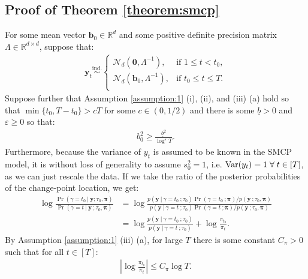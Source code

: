 \subsection{Proof of Theorem \ref{theorem:smcp}}
\label{app:localization-smcp}

For some mean vector $\mathbf{b}_0 \in \mathbb{R}^d$ and some positive definite precision matrix $\Lambda \in \mathbb{R}^{d \times d}$, suppose that:
\begin{align*}
    \mathbf{y}_t \overset{\text{ind.}}{\sim}
    \begin{cases}
        \mathcal{N}_d(\mathbf{0},\Lambda^{-1}), &\text{if } 1 \leq t < t_0, \\
        \mathcal{N}_d(\mathbf{b}_0,\Lambda^{-1}), &\text{if } t_0 \leq t \leq T. \\
    \end{cases}
\end{align*}
Suppose further that Assumption \ref{assumption:1} (i), (ii), and (iii) (a) hold so that $\min\{t_0, T-t_0\} > cT$ for some $c \in (0,1/2)$ and there is some $\underline{b} > 0$ and $\varepsilon \geq 0$ so that:
\begin{align}\label{eq:thm1-b_0-bd}
    b^2_0 \geq \frac{\underline{b}^2}{\log^{\varepsilon} T}.
\end{align}
Furthermore, because the variance of $y_t$ is assumed to be known in the SMCP model, it is without loss of generality to assume $s_0^2 = 1$, i.e. $\text{Var}(y_t) = 1 \;\forall\; t \in [T]$, as we can just rescale the data. If we take the ratio of the posterior probabilities of the change-point location, we get:
\begin{align*}
    \log \frac{\Pr(\gamma = t_0  \:|\: \mathbf{y} ; \tau_0,\pmb{\pi})}{\Pr(\gamma = t  \:|\: \mathbf{y} \:; \tau_0,\pmb{\pi})} &=  \log \frac{p(\mathbf{y} \:|\:\gamma = t_0 \:; \tau_0)\Pr(\gamma = t_0 \:; \pmb{\pi})/ p(\mathbf{y}\:;\tau_0,\pmb{\pi})}{p(\mathbf{y} \:|\:\gamma = t \:; \tau_0)\Pr(\gamma = t \:;\pmb{\pi})/ p(\mathbf{y}\:;\tau_0,\pmb{\pi})} \tag{Bayes' rule} \\
    &= \log \frac{p(\mathbf{y} \:|\:\gamma = t_0 \:; \tau_0)}{p(\mathbf{y} \:|\:\gamma = t \:; \tau_0)} + \log \frac{\pi_{t_0}}{\pi_t}.
\end{align*}
By Assumption \ref{assumption:1} (iii) (a), for large $T$ there is some constant $C_\pi > 0$ such that for all $t \in [T]$: 
\begin{align}\label{eq:thm1-prior-bd}
    \left|\log \frac{\pi_{t_0}}{\pi_t}\right| \leq C_\pi \log T.
\end{align}
